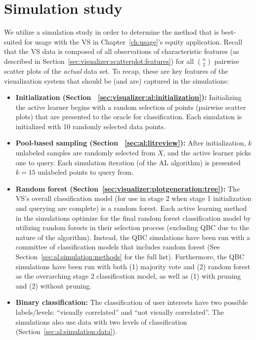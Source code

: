 \section{Simulation study}
\label{sec:al:simulations}

We utilize a simulation study in order to determine the method that is 
best-suited for usage with the VS in Chapter~\ref{ch:usage}'s equity 
application. Recall that the VS data is composed of all observations of 
characteristic features (as described in 
Section~\ref{sec:visualizer:scatterplot:features}) 
for all $n\choose 2$ pairwise scatter plots of the \textit{actual} data set. To 
recap, these are key features of the visualization system that 
should be (and are) captured in the simulations:

\tablespacing
\begin{itemize}
	\item \textbf{Initialization (Section 
	~\ref{sec:visualizer:al:initialization}):} 
	Initializing the active learner begins with a random selection of
	points (pairwise scatter plots) that are presented to the oracle for 
	classification. Each simulation is initialized with 10 randomly selected 
	data points.
	
	\item \textbf{Pool-based sampling (Section ~\ref{sec:al:litreview}):} After 
	initialization, $k$ unlabeled samples are randomly selected from $X$, and 
	the active learner picks one to query. Each simulation iteration (of the AL 
	algorithm) is presented $k=15$ unlabeled points to query from.
	
	\item \textbf{Random forest 
	(Section~\ref{sec:visualizer:plotgeneration:tree}):} The VS's overall 
	classification model (for use in stage 2 when stage 1 initialization and 
	querying are complete) is a random forest. Each active learning method in 
	the simulations optimize for the 
	final random forest classification model by utilizing random forests in 
	their selection process (excluding QBC due to the nature of the 
	algorithm). Instead, the QBC simulations have been run with a committee of 
	classification models that includes random forest (See 
	Section~\ref{sec:al:simulation:methods} for the full list). Furthermore, 
	the QBC simulations have been run with both (1) majority vote and (2) 
	random forest as the overarching stage 2 classification model, as well as 
	(1) with pruning and (2) without pruning.
	
	\item \textbf{Binary classification:} The classification of user 
	interests have two possible labels/levels: ``visually correlated'' and 
	``not visually correlated''. The simulations also use data with two levels 
	of classification (Section~\ref{sec:al:simulation:data}).
\end{itemize}
\bodyspacing

